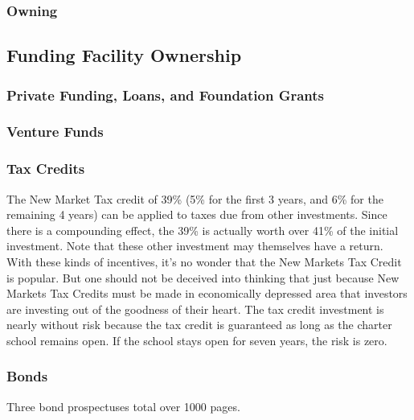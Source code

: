\subsubsection{Owning}\label{sec:findings-owning}\indent

\subsection{Funding Facility Ownership}\label{sec:findings-funding-ownership}\indent

\subsubsection{Private Funding, Loans, and Foundation Grants}\label{sec:findings-private-funding}\indent

\subsubsection{Venture Funds}\label{sec:findings-venture-funds}\indent

\subsubsection{Tax Credits}\label{sec:findings-tax-credits}\indent

The New Market Tax credit of 39\% (5\% for the first 3 years, and 6\% for the remaining 4 years) can be applied to taxes due from other investments. Since there is a compounding effect, the 39\% is actually worth over 41\% of the initial investment. Note that these other investment may themselves have a return. With these kinds of incentives, it's no wonder that the New Markets Tax Credit is popular. But one should not be deceived into thinking that just because New Markets Tax Credits must be made in economically depressed area that investors are investing out of the goodness of their heart. The tax credit investment is nearly without risk because the tax credit is guaranteed as long as the charter school remains open. If the school stays open for seven years, the risk is zero.

\subsubsection{Bonds}\label{sec:findings-bonds}\indent

 Three bond prospectuses total over 1000 pages.    

